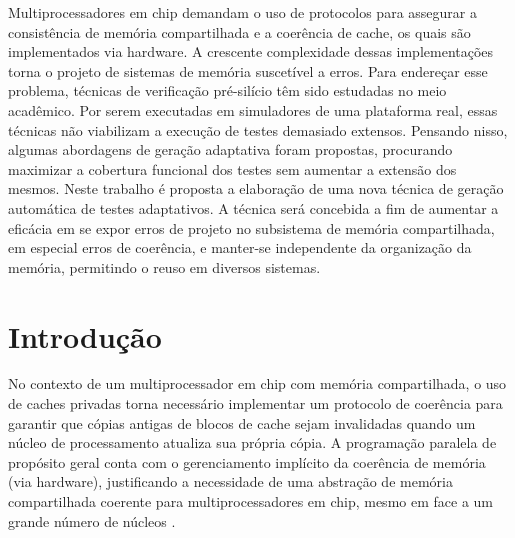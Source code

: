 \documentclass{ufsc-thesis} %
\newcommand{\critico}[1]{{\color{red}\textbf{{#1}}}}
\begin{document}

\par Multiprocessadores em chip demandam o uso de protocolos para assegurar a consistência de
memória compartilhada e a coerência de cache, os quais são implementados via hardware. A
crescente complexidade dessas implementações torna o projeto de sistemas de memória suscetível
a erros. Para endereçar esse problema, técnicas de verificação pré-silício têm sido estudadas
no meio acadêmico. Por serem executadas em simuladores de uma plataforma real, essas técnicas
não viabilizam a execução de testes demasiado extensos. Pensando nisso, algumas abordagens de
geração adaptativa foram propostas, procurando maximizar a cobertura funcional dos testes sem
aumentar a extensão dos mesmos. Neste trabalho é proposta a elaboração de uma nova técnica de
geração automática de testes adaptativos. A técnica será concebida a fim de aumentar a eficácia
em se expor erros de projeto no subsistema de memória compartilhada, em especial erros de
coerência, e manter-se independente da organização da memória, permitindo o reuso em diversos
sistemas.

%


\newpage
\tableofcontents

\chapter{Introdução}

No contexto de um multiprocessador em chip com memória compartilhada, o uso de caches privadas
torna necessário implementar um protocolo de coerência para garantir que cópias antigas de
blocos de cache sejam invalidadas quando um núcleo de processamento atualiza sua própria cópia.
A programação paralela de propósito geral conta com o gerenciamento implícito da coerência de
memória (via hardware), justificando a necessidade de uma abstração de memória compartilhada
coerente para multiprocessadores em chip, mesmo em face a um grande número de núcleos \cite{Devadas:2013}.
\end{document}
